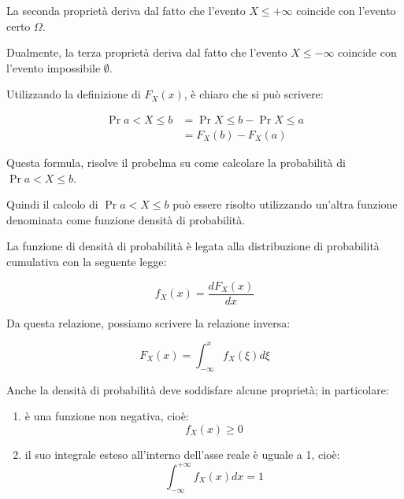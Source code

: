 La seconda proprietà deriva dal fatto che l'evento $X \leq +\infty$ coincide con l'evento certo $\Omega$. \newline 

Dualmente, la terza proprietà deriva dal fatto che l'evento $X \leq - \infty$ coincide con l'evento impossibile $\emptyset$. \newline 

Utilizzando la definizione di $F_X (x)$, è chiaro che si può scrivere: 

{
    \Large 
    \begin{equation}
        \begin{split}
            \Pr{a < X \leq b} 
            &= 
            \Pr{X \leq b} 
            - 
            \Pr{X \leq a} 
            \\
            &= 
            F_X (b) - F_X (a)
        \end{split}
    \end{equation}
}

Questa formula, risolve il probelma su come calcolare la probabilità di $\Pr{a < X \leq b} $. \newline 

Quindi il calcolo di $\Pr{a < X \leq b} $ può essere risolto utilizzando un'altra funzione denominata come 
funzione densità di probabilità. \newline 

La funzione di densità di probabilità è legata alla distribuzione di probabilità cumulativa con la seguente legge: 

{
    \Large 
    \begin{equation}
        f_X (x) = \frac{d F_X (x)}{d x}
    \end{equation}
}


Da questa relazione, possiamo scrivere la relazione inversa: 

{
    \Large 
    \begin{equation}
        F_X (x) 
        = 
        \int_{-\infty}^{x} 
        f_X (\xi) d\xi 
    \end{equation}
}

Anche la densità di probabilità deve soddisfare alcune proprietà; in particolare:

\begin{enumerate}
    \item è una funzione non negativa, cioè: 
    {
        \Large 
        \begin{equation}
            f_X (x) \geq 0
        \end{equation}
    } 

    \item  il suo integrale esteso all'interno dell'asse reale è uguale a 1, cioè: 
    {
        \Large 
        \begin{equation}
            \int_{-\infty}^{+\infty} 
            f_X (x) dx = 1
        \end{equation}
    }
\end{enumerate}

